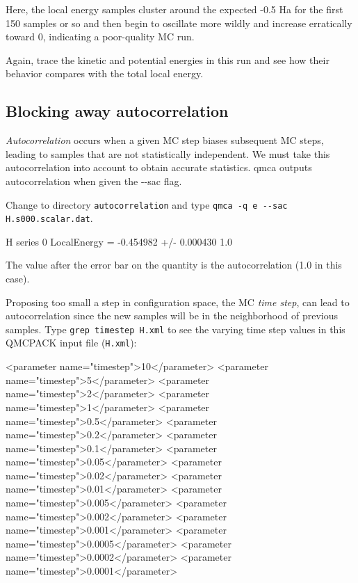 
Here, the local energy samples cluster around the expected -0.5 Ha for the
first 150 samples or so and then begin to oscillate more wildly and increase
erratically toward 0, indicating a poor-quality MC run.

Again, trace the kinetic and potential energies in this run and see how their
behavior compares with the total local energy.

\subsection{Blocking away autocorrelation}

\textit{Autocorrelation} occurs when a given MC step biases subsequent MC
steps, leading to samples that are not statistically independent.  We must take
this autocorrelation into account to obtain accurate statistics.  qmca
outputs autocorrelation when given the {-}{-}sac flag.

Change to directory \texttt{autocorrelation} and type \texttt{qmca -q e
{-}{-}sac H.s000.scalar.dat}.  

\begin{shade} 
H  series 0  LocalEnergy = -0.454982 +/- 0.000430    1.0 
\end{shade}

The value after the error bar on the quantity is the autocorrelation (1.0 in
this case).

Proposing too small a step in configuration space, the MC \textit{time step},
can lead to autocorrelation since the new samples will be in the neighborhood
of previous samples.  Type \texttt{grep timestep H.xml} to see the varying time
step values in this QMCPACK input file (\texttt{H.xml}):

\begin{shade} 
<parameter name="timestep">10</parameter>
<parameter name="timestep">5</parameter> 
<parameter name="timestep">2</parameter> 
<parameter name="timestep">1</parameter>
<parameter name="timestep">0.5</parameter> 
<parameter name="timestep">0.2</parameter> 
<parameter name="timestep">0.1</parameter>
<parameter name="timestep">0.05</parameter> 
<parameter name="timestep">0.02</parameter> 
<parameter name="timestep">0.01</parameter>
<parameter name="timestep">0.005</parameter> 
<parameter name="timestep">0.002</parameter> 
<parameter name="timestep">0.001</parameter>
<parameter name="timestep">0.0005</parameter> 
<parameter name="timestep">0.0002</parameter> 
<parameter name="timestep">0.0001</parameter> 
\end{shade}

